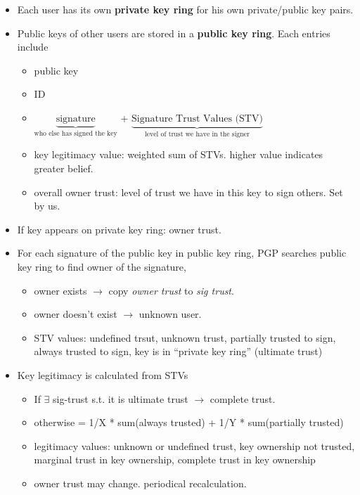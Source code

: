 \documentclass[twocolumn,landscape,10pt]{article}
\theoremstyle{definition}
\begin{document}
\begin{itemize}
    \item Each user has its own \textbf{private key ring} for his own
        private/public key pairs.
    \item Public keys of other users are stored in a \textbf{public key ring}.
        Each entries include
        \begin{itemize}
            \item public key
            \item ID
            \item $\underbrace{\text{signature}}_{\text{who else has signed the key}}$ +
                $\underbrace{\text{Signature Trust Values (STV)}}_{\text{level of
                trust we have in the signer}}$
            \item key legitimacy value: weighted sum of STVs. higher value
                indicates greater belief.
            \item overall owner trust: level of trust we have in this key to
                sign others. Set by us.
        \end{itemize} 
    \item If key appears on private key ring: owner trust.
    \item For each signature of the public key in public key ring, PGP searches
        public key ring to find owner of the signature,
        \begin{itemize}
            \item owner exists $\rightarrow$ copy \emph{owner trust} to
                \emph{sig trust}.
            \item owner doesn't exist $\rightarrow$ unknown user.
            \item STV values: undefined trsut, unknown trust, partially trusted
                to sign, always trusted to sign, key is in ``private key ring''
                (ultimate trust)
        \end{itemize} 
    \item Key legitimacy is calculated from STVs
        \begin{itemize}
            \item If $\exists$ sig-trust s.t. it is ultimate trust $\rightarrow$
                complete trust.
            \item otherwise = 1/X * sum(always trusted) + 1/Y * sum(partially trusted)
            \item legitimacy values: unknown or undefined trust, key ownership
                not trusted, marginal trust in key ownership, complete trust in
                key ownership
            \item owner trust may change. periodical recalculation.
        \end{itemize} 
\end{itemize} 
\end{document}
